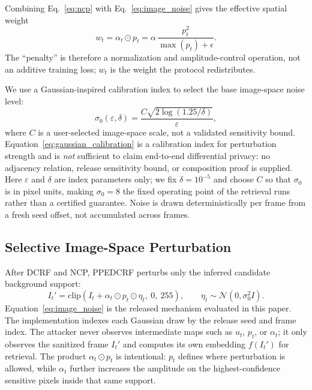 \documentclass[10pt,journal]{IEEEtran}
\begin{document}
Combining Eq.~\eqref{eq:ncp} with Eq.~\eqref{eq:image_noise} gives the
effective spatial weight
\begin{equation}
\label{eq:effective_weight}
w_t = \alpha_t \odot p_t
    = \alpha\,\frac{p_t^2}{\max(p_t)+\epsilon}.
\end{equation}
The ``penalty'' is therefore a normalization and amplitude-control operation,
not an additive training loss; $w_t$ is the weight the protocol redistributes.

We use a Gaussian-inspired calibration index to select the base image-space noise level:
\begin{equation}
\label{eq:gaussian_calibration}
\sigma_0(\varepsilon,\delta) =
\frac{C\sqrt{2\log(1.25/\delta)}}{\varepsilon},
\end{equation}
where $C$ is a user-selected image-space scale, not a validated sensitivity
bound. Equation~\eqref{eq:gaussian_calibration} is a calibration index for
perturbation strength and is \emph{not} sufficient to claim end-to-end
differential privacy: no adjacency relation, release sensitivity bound, or
composition proof is supplied. Here $\varepsilon$ and $\delta$ are index
parameters only; we fix $\delta=10^{-5}$ and choose $C$ so that $\sigma_0$ is
in pixel units, making $\sigma_0=8$ the fixed operating point of the retrieval
runs rather than a certified guarantee. Noise is drawn deterministically per
frame from a fresh seed offset, not accumulated across frames.

\subsection{Selective Image-Space Perturbation}
After DCRF and NCP, PPEDCRF perturbs only the inferred candidate background support:
\begin{equation}
\label{eq:image_noise}
I_t' = \mathrm{clip}\!\left(I_t + \alpha_t \odot p_t \odot \eta_t,\ 0,\ 255\right),
\qquad
\eta_t \sim \mathcal{N}(0,\sigma_0^2 I).
\end{equation}
Equation~\eqref{eq:image_noise} is the released mechanism evaluated in this paper. The implementation indexes each Gaussian draw by the release seed and frame index. The attacker never observes intermediate maps such as $u_t$, $p_t$, or $\alpha_t$; it only observes the sanitized frame $I_t'$ and computes its own embedding $f(I_t')$ for retrieval. The product $\alpha_t \odot p_t$ is intentional: $p_t$ defines where perturbation is allowed, while $\alpha_t$ further increases the amplitude on the highest-confidence sensitive pixels inside that same support.
\end{document}
